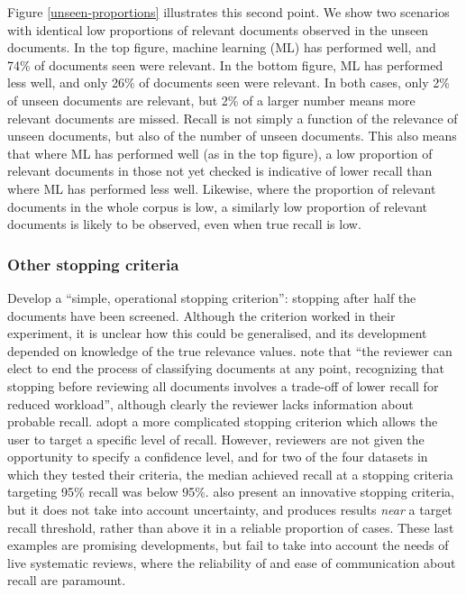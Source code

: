 \documentclass{bmcart}
\begin{document}
Figure \ref{unseen-proportions} illustrates this second point. 
We show two scenarios with identical low proportions of relevant documents observed in the unseen documents.
In the top figure, machine learning (ML) has performed well, and 74\% of documents seen were relevant. 
In the bottom figure,  ML has performed less well, and only 26\% of documents seen were relevant.
In both cases, only 2\% of unseen documents are relevant, but 2\% of a larger number means more relevant documents are missed.
Recall is not simply a function of the relevance of unseen documents, but also of the number of unseen documents. 
This also means that where ML has performed well (as in the top figure), a low proportion of relevant documents in those not yet checked is indicative of lower recall than where ML has performed less well.
Likewise, where the proportion of relevant documents in the whole corpus is low, a similarly low proportion of relevant documents is likely to be observed, even when true recall is low.



\subsubsection*{Other stopping criteria}

\cite{Wallace2010a} Develop a ``simple, operational stopping criterion'': stopping after half the documents have been screened. Although the criterion worked in their experiment, it is unclear how this could be generalised, and its development depended on knowledge of the true relevance values. 
\cite{Jonnalagadda2013} note that ``the reviewer can elect to end the process of classifying documents at any point, recognizing that stopping before reviewing all documents involves a trade-off of lower recall for reduced workload'', although clearly the reviewer lacks information about probable recall.
\cite{Yu2019} adopt a more complicated stopping criterion which allows the user to target a specific level of recall. However, reviewers are not given the opportunity to specify a confidence level, and for two of the four datasets in which they tested their criteria, the median achieved recall at a stopping criteria targeting 95\% recall was below 95\%. \cite{DiNunzio2018} also present an innovative stopping criteria, but it does not take into account uncertainty, and produces results \textit{near} a target recall threshold, rather than above it in a reliable proportion of cases. 
These last examples are promising developments, but fail to take into account the needs of live systematic reviews, where the reliability of and ease of communication about recall are paramount.
\end{document}
